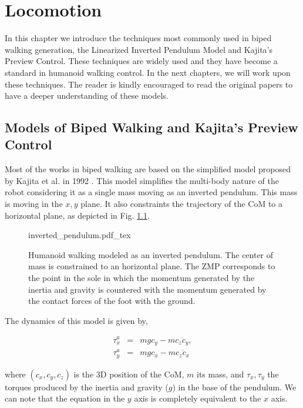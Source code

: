 
\chapter{Locomotion} 
\label{Chap:Locomotion-Control}

In this chapter we introduce the techniques most commonly used in biped walking generation, the Linearized Inverted Pendulum Model and Kajita's Preview Control. These techniques are widely used and they have become a standard in humanoid walking control. In the next chapters, we will work upon these techniques. The reader is kindly encouraged to read the original papers to have a deeper understanding of these models.


\section{Models of Biped Walking and Kajita's Preview Control}
Most of the works in biped walking are based on the simplified model proposed by Kajita et al. in 1992 \citep{Kajita1992}. This model simplifies the multi-body nature of the robot considering it as a single mass moving as an inverted pendulum. This mass is moving in the $x,y$ plane. It also constraints the trajectory of the CoM to a horizontal plane, as depicted in Fig. \ref{Fig:Inverted-Pendulum}.

\begin{figure}
  \centering
      {\def\svgwidth{1.0\columnwidth}
        
                   {inverted_pendulum.pdf_tex}}
      \caption[]{Humanoid walking modeled as an inverted pendulum. The center of mass is constrained to an horizontal plane. The ZMP corresponds to the point in the sole in which the momentum generated by the inertia and gravity is countered with the momentum generated by the contact forces of the foot with the ground.}
      \label{Fig:Inverted-Pendulum}
\end{figure}

The dynamics of this model is given by,

\begin{eqnarray}
\label{Eq:LIPM_dynamics}
\tau^a_x &=& mgc_y - mc_z \ddot{c}_y, \\
\tau^a_y &=& mgc_x - mc_z \ddot{c}_x
\end{eqnarray}

where $(c_x, c_y, c_z)$ is the 3D position of the CoM, $m$ its mass, and $\tau_x, \tau_y$ the torques produced by the inertia and gravity ($g$) in the base of the pendulum. We can note that the equation in the $y$ axis is completely equivalent to the $x$ axis.

